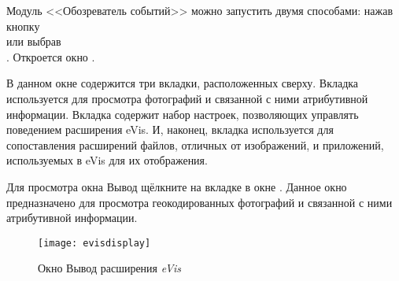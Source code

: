 \label{evis_launch_browser}

Модуль <<Обозреватель событий>> можно запустить двумя способами:
нажав кнопку \\
 или
выбрав  \arrow {} \arrow \\
. Откроется окно .

В данном окне содержится три вкладки, расположенных сверху. Вкладка 
используется для просмотра фотографий и связанной с ними атрибутивной
информации. Вкладка  содержит набор настроек, позволяющих
управлять поведением расширения eVis. И, наконец, вкладка 
используется для сопоставления расширений файлов, отличных от изображений,
и приложений, используемых в eVis для их отображения.

\label{evis_display_window}

Для просмотра окна Вывод щёлкните на вкладке  в
окне . Данное окно предназначено для просмотра
геокодированных фотографий и связанной с ними атрибутивной информации.

\begin{figure}[ht]
   \centering
   \texttt{[image: evisdisplay]}
   \caption{\label{evisdisplay}Окно Вывод расширения \emph{eVis}
   \wincaption}
\end{figure}

